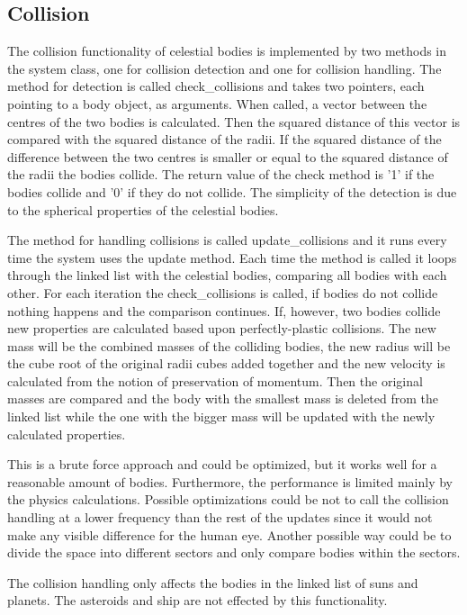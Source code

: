 \documentclass[a4paper,12pt]{article} \usepackage{graphicx}
\begin{document}
\subsection{Collision}
The collision functionality of celestial bodies is implemented by two methods
in the system class, one for collision detection and one for collision
handling. The method for detection is called check\_collisions and takes two
pointers, each pointing to a body object, as arguments. When called, a vector
between the centres of the two bodies is calculated. Then the squared distance
of this vector is compared with the squared distance of the radii. If the
squared distance of the difference between the two centres is smaller or equal
to the squared distance of the radii the bodies collide. The return value of
the check method is '1' if the bodies collide and '0' if they do not collide.
The simplicity of the detection is due to the spherical properties of the
celestial bodies.

The method for handling collisions is called update\_collisions and it runs
every time the system uses the update method. Each time the method is called it
loops through the linked list with the celestial bodies, comparing all bodies
with each other. For each iteration the check\_collisions is called, if bodies
do not collide nothing happens and the comparison continues. If, however, two
bodies collide new properties are calculated based upon perfectly-plastic
collisions. The new mass will be the combined masses of the colliding bodies,
the new radius will be the cube root of the original radii cubes added together
and the new velocity is calculated from the notion of preservation of momentum.
Then the original masses are compared and the body with the smallest mass is
deleted from the linked list while the one with the bigger mass will be updated
with the newly calculated properties.

This is a brute force approach and could be optimized, but it works well for a
reasonable amount of bodies. Furthermore, the performance is limited mainly by
the physics calculations. Possible optimizations could be not to call the
collision handling at a lower frequency than the rest of the updates since it
would not make any visible difference for the human eye. Another possible way
could be to divide the space into different sectors and only compare bodies
within the sectors. 

The collision handling only affects the bodies in the linked list of suns and
planets. The asteroids and ship are not effected by this functionality.
\end{document}
